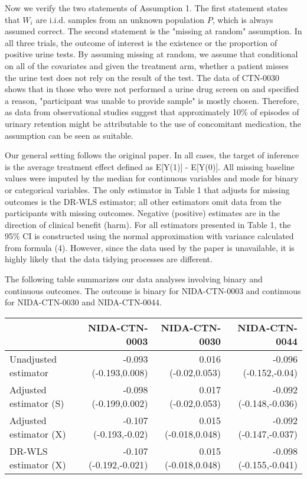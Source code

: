 \documentclass{article}
\begin{document}
Now we verify the two statements of Assumption 1. The first statement states that $W_i$ are i.i.d. samples from an unknown population $P$, which is always assumed correct. The second statement is the "missing at random" assumption. In all three trials, the outcome of interest is the existence or the proportion of positive urine tests. By assuming missing at random, we assume that conditional on all of the covariates and given the treatment arm, whether a patient misses the urine test does not rely on the result of the test. The data of CTN-0030 shows that in those who were not performed a urine drug screen on and specified a reason, "participant was unable to provide sample" is mostly chosen. Therefore, as data from observational studies suggest that approximately 10\% of episodes of urinary retention might be attributable to the use of concomitant medication\cite{verhamme2018}, the assumption can be seen as suitable.

Our general setting follows the original paper. In all cases, the target of inference is the average treatment effect defined as E[Y(1)] - E[Y(0)]. All missing baseline values were imputed by the median for continuous variables and mode for binary or categorical variables. The only estimator in Table 1 that adjusts for missing outcomes is the DR-WLS estimator; all other estimators omit data from the participants with missing outcomes. Negative (positive) estimates are in the direction of clinical benefit (harm). For all estimators presented in Table 1, the 95\% CI is constructed using the normal approximation with variance calculated from formula (4). However, since the data used by the paper is unavailable, it is highly likely that the data tidying processes are different.

The following table summarizes our data analyses involving binary and continuous outcomes. The outcome is binary for NIDA-CTN-0003 and continuous for NIDA-CTN-0030 and NIDA-CTN-0044. 

\begin{tabular}{l|rrr}
\hline
 & NIDA-CTN-0003 & NIDA-CTN-0030 & NIDA-CTN-0044 \\
\hline
Unadjusted estimator & -0.093 (-0.193,0.008) & 0.016 (-0.02,0.053) & -0.096 (-0.152,-0.04) \\
Adjusted estimator (S) & -0.098 (-0.199,0.002) & 0.017 (-0.02,0.053) & -0.092 (-0.148,-0.036) \\
Adjusted estimator (X) & -0.107 (-0.193,-0.02) & 0.015 (-0.018,0.048) & -0.092 (-0.147,-0.037) \\
DR-WLS estimator (X) & -0.107 (-0.192,-0.021) & 0.015 (-0.018,0.048) & -0.098
(-0.155,-0.041) \\
\hline
\end{tabular}
\end{document}
